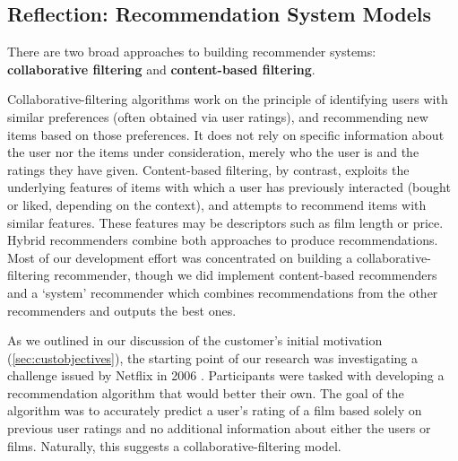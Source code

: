 \documentclass{l3proj}
\begin{document}
\subsection{Reflection: Recommendation System Models}
\label{sec:modelreflection}

There are two broad approaches to building recommender systems: \textbf{collaborative filtering} and \textbf{content-based filtering}. 

Collaborative-filtering algorithms work on the principle of identifying users with similar preferences (often obtained via user ratings), and recommending new items based on those preferences. It does not rely on specific information about the user nor the items under consideration, merely who the user is and the ratings they have given. Content-based filtering, by contrast, exploits the underlying features of items with which a user has previously interacted (bought or liked, depending on the context), and attempts to recommend items with similar features. These features may be descriptors such as film length or price. Hybrid recommenders combine both approaches to produce recommendations. Most of our development effort was concentrated on building a collaborative-filtering recommender, though we did implement content-based recommenders and a `system' recommender which combines recommendations from the other recommenders and outputs the best ones. 

As we outlined in our discussion of the customer’s initial motivation (\ref{sec:custobjectives}), the starting point of our research was investigating a challenge issued by Netflix in 2006 \cite{NetflixPrize}. Participants were tasked with developing a recommendation algorithm that would better their own. The goal of the algorithm was to accurately predict a user's rating of a film based solely on previous user ratings and no additional information about either the users or films. Naturally, this suggests a collaborative-filtering model.
\end{document}
